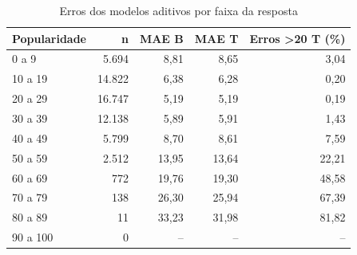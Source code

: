 \begin{table}[htbp]
\centering\small
\caption{Erros dos modelos aditivos por faixa da resposta}\label{tab:erros_faixas}
\begin{tabular}{lrrrr}
\toprule
Popularidade & n & MAE B & MAE T & Erros >20 T (\%)\\\midrule
0 a 9 & 5.694 & 8,81 & 8,65 & 3,04\\
10 a 19 & 14.822 & 6,38 & 6,28 & 0,20\\
20 a 29 & 16.747 & 5,19 & 5,19 & 0,19\\
30 a 39 & 12.138 & 5,89 & 5,91 & 1,43\\
40 a 49 & 5.799 & 8,70 & 8,61 & 7,59\\
50 a 59 & 2.512 & 13,95 & 13,64 & 22,21\\
60 a 69 & 772 & 19,76 & 19,30 & 48,58\\
70 a 79 & 138 & 26,30 & 25,94 & 67,39\\
80 a 89 & 11 & 33,23 & 31,98 & 81,82\\
90 a 100 & 0 & -- & -- & --\\
\bottomrule
\end{tabular}
\end{table}
